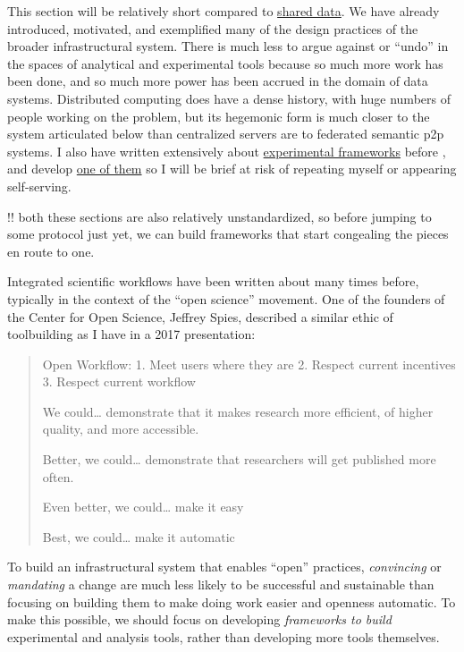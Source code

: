 \documentclass[10pt]{tufte-book}
\begin{document}
This section will be relatively short compared to
\protect\hyperlink{shared-data}{shared data}. We have already
introduced, motivated, and exemplified many of the design practices of
the broader infrastructural system. There is much less to argue against
or ``undo'' in the spaces of analytical and experimental tools because
so much more work has been done, and so much more power has been accrued
in the domain of data systems. Distributed computing does have a dense
history, with huge numbers of people working on the problem, but its
hegemonic form is much closer to the system articulated below than
centralized servers are to federated semantic p2p systems. I also have
written extensively about
\protect\hyperlink{experimental-frameworks}{experimental frameworks}
before \citep{saundersAutopilotAutomatingBehavioral2019} , and
develop \href{https://docs.auto-pi-lot.com/en/latest/}{one of them} so I
will be brief at risk of repeating myself or appearing self-serving.

!! both these sections are also relatively unstandardized, so before
jumping to some protocol just yet, we can build frameworks that start
congealing the pieces en route to one.

Integrated scientific workflows have been written about many times
before, typically in the context of the ``open science'' movement. One
of the founders of the Center for Open Science, Jeffrey Spies, described
a similar ethic of toolbuilding as I have in a 2017 presentation:

\begin{quote}
Open Workflow: 1. Meet users where they are 2. Respect current
incentives 3. Respect current workflow

We could\ldots{} demonstrate that it makes research more efficient, of
higher quality, and more accessible.

Better, we could\ldots{} demonstrate that researchers will get published
more often.

Even better, we could\ldots{} make it easy

Best, we could\ldots{} make it automatic \citep{spiesWorkflowCentricApproachIncreasing2017} 
\end{quote}

To build an infrastructural system that enables ``open'' practices,
\emph{convincing} or \emph{mandating} a change are much less likely to
be successful and sustainable than focusing on building them to make
doing work easier and openness automatic. To make this possible, we
should focus on developing \emph{frameworks to build} experimental and
analysis tools, rather than developing more tools themselves.
\end{document}
